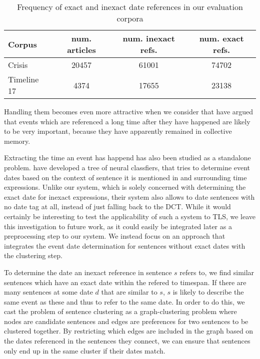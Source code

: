 \documentclass[a4paper,BCOR=10mm]{report}
\numberwithin{lemma}{chapter}
\numberwithin{definition}{chapter}
\begin{document}
\begin{table}
\begin{center}
\begin{tabular}{|l|c|c|c|}
\hline
\textbf{Corpus} & \textbf{num. articles} & \textbf{num. inexact refs.} & \textbf{num. exact refs.} \\\hline
Crisis & 20457 & 61001 & 74702 \\
Timeline 17 & 4374 & 17655 & 23138 \\\hline
\end{tabular}
\caption{Frequency of exact and inexact date references in our evaluation corpora}
\label{tab:ambigous-date-ref}
\end{center}
\end{table}


Handling them becomes even more attractive when we consider that \citet{datesel-graph} have argued that events which are referenced a long time after they have happened are likely to be very important, because they have apparently remained in collective memory. %

Extracting the time an event has happend has also been studied as a standalone problem. \citet{event-time-extraction} have developed a tree of neural classfiers, that tries to determine event dates based on the context of sentence it is mentioned in and surrounding time expressions. Unlike our system, which is solely concerned with determining the exact date for inexact expressions, their system also allows to date sentences with no date tag at all, instead of just falling back to the DCT.
While it would certainly be interesting to test the applicability of such a system to TLS, we leave this investigation to future work, as it could easily be integrated later as a preprocessing step to our system.
We instead focus on an approach that integrates the event date determination for sentences without exact dates with the clustering step.

To determine the date an inexact reference in sentence $s$ refers to, we find similar sentences which have an exact date within the refered to timespan. If there are many sentences at some date $d$ that are similar to $s$, $s$ is likely to describe the same event as these and thus to refer to the same date. In order to do this, we cast the problem of sentence clustering as a graph-clustering problem where nodes are candidate sentences and edges are preferences for two sentences to be clustered together. By restricting which edges are included in the graph based on the dates referenced in the sentences they connect, we can ensure that sentences only end up in the same cluster if their dates match.
\end{document}
